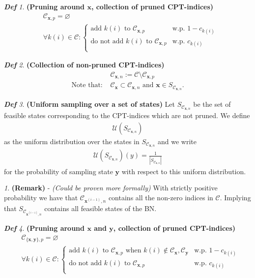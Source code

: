 \documentclass{amsart}
\newcommand{\bfx}{{\mathbf{x}}}
\newcommand{\bfy}{{\mathbf{y}}}
\theoremstyle{plain}
\theoremstyle{remark}
\newtheorem*{remark*}{}
\newtheorem*{definition*}{\textbf{\em Def}}
\theoremstyle{plain}
\newcommand{\C}{{\mathcal C}}
\newcommand{\U}{{\mathcal{U}}}
\let\emptyset\varnothing
\newcommand{\vs}{\vspace{0.75pc}}
\begin{document}
\begin{definition*}\textbf{ (Pruning around $\bfx$, collection of pruned CPT-indices) }
\begin{align*}
&\C_{\bfx,p} = \emptyset\\
& \forall k(i) \in \C:
\begin{cases}
\text{add $k(i)$ to $\C_{\bfx, p}$} & \text{w.p. $1-c_{k(i)}$}\\
\text{do not add $k(i)$ to $\C_{\bfx, p}$} & \text{w.p. $c_{k(i)}$}\\
\end{cases}
\end{align*}
\end{definition*}\vs 

\begin{definition*}\textbf{ (Collection of non-pruned CPT-indices) }
\begin{align*}
&\C_{\bfx,n}:=\C \setminus \C_{\bfx,p}\\
\text{Note that: } &\C_\bfx \subset \C_{\bfx,n} \text{ and } \bfx \in S_{\C_{\bfx,n}}.
\end{align*}
\end{definition*}\vs 

\begin{definition*}\textbf{ (Uniform sampling over a set of states) }
Let $S_{\C_{\bfx,n}}$ be the set of feasible states corresponding to the CPT-indices which are not pruned. We define
\begin{align*}
\U(S_{\C_{\bfx,n}})
\end{align*}
as the uniform distribution over the states in $S_{\C_{\bfx,n}}$ and we write
\begin{align*}
\U(S_{\C_{\bfx,n}})(y) = \frac{1}{|S_{\C_{\bfx,n}}|}
\end{align*}
for the probability of sampling state $\bfy$ with respect to this uniform distribution.
\end{definition*}\vs 

\begin{remark*}\textbf{ (Remark) } - \textit{ (Could be proven more formally) }
With strictly positive probability we have that $\C_{\bfx^{(i-1)},n}$ contains all the non-zero indices in $\C$. Implying that $S_{\C_{\bfx^{(i-1)},n}}$ contains all feasible states of the BN.
\end{remark*}\vs

\begin{definition*}\textbf{ (Pruning around $\bfx$ and $\bfy$, collection of pruned CPT-indices) }
\begin{align*}
&\C_{\{\bfx,\bfy\},p} = \emptyset\\
& \forall k(i) \in \C:
\begin{cases}
\text{add $k(i)$ to $\C_{\bfx, p}$ when $k(i) \notin \C_\bfx, \C_\bfy$}  & \text{w.p. $1-c_{k(i)}$}\\
\text{do not add $k(i)$ to $\C_{\bfx, p}$} & \text{w.p. $c_{k(i)}$}\\
\end{cases}
\end{align*}
\end{definition*}\vs 
\end{document}
